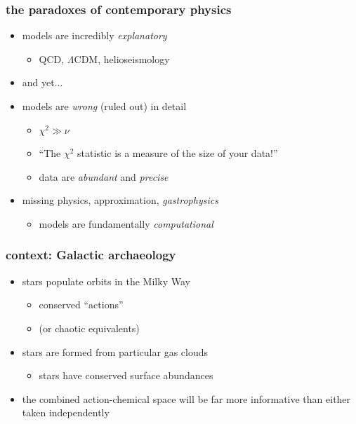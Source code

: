 \documentclass[pdftex]{beamer}
\begin{document}
\begin{frame}
  \frametitle{the paradoxes of contemporary physics}
  \begin{itemize}
  \item models are incredibly \emph{explanatory}
    \begin{itemize}
    \item QCD, $\Lambda$CDM, helioseismology
    \end{itemize}
  \item and yet...
  \item<2-> models are \emph{wrong} (ruled out) in detail
    \begin{itemize}
    \item $\chi^2 \gg \nu$
    \item ``The $\chi^2$ statistic is a measure of the size of your data!''
    \item data are \emph{abundant} and \emph{precise}
    \end{itemize}
  \item<3-> missing physics, approximation, \emph{gastrophysics}
    \begin{itemize}
    \item models are fundamentally \emph{computational}
    \end{itemize}
  \end{itemize}
\end{frame}

\begin{frame}
  \frametitle{context: Galactic archaeology}
  \begin{itemize}
  \item stars populate orbits in the Milky Way
    \begin{itemize}
    \item conserved ``actions''
    \item (or chaotic equivalents)
    \end{itemize}
  \item stars are formed from particular gas clouds
    \begin{itemize}
    \item stars have conserved surface abundances
    \end{itemize}
  \item the combined action-chemical space will be far more
    informative than either taken independently
  \end{itemize}
\end{frame}
\end{document}
